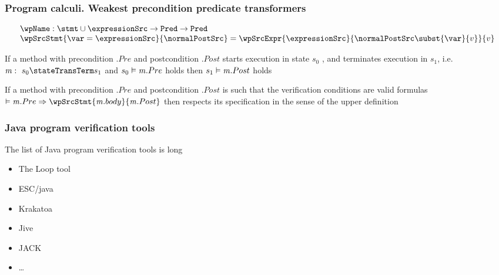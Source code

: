 \documentclass{beamer}
\begin{document}
 \begin{frame}[shrink]\frametitle{Program calculi. Weakest precondition  predicate transformers}
   \begin{definition}

   $$ \begin{array}{l} 
       \wpName : \stmt \cup \expressionSrc \rightarrow \Pred   \rightarrow \Pred   \\
       \wpSrcStmt{ \var = \expressionSrc}{\normalPostSrc } =  \wpSrcExpr{\expressionSrc}{\normalPostSrc \subst{\var}{v} }{v} \\
    \end{array}
$$
      \end{definition} 

  \begin{definition}
     If a method \methodd{} with precondition  \methodd.$Pre$
        and postcondition \methodd.$Post$ starts execution in state $s_0$ , and terminates execution in $s_1$, i.e.  \ $\methodd: \  s_0  \stateTransTerm s_1 $ 
          and $s_0 \vDash \mbox{\rm\textit{m}}.Pre $ holds    
         then $s_1 \vDash \mbox{\rm\textit{m}}.Post$ holds
       \end{definition}

     \begin{theorem}
        If a method \methodd{} with precondition  \methodd.$Pre$
        and postcondition \methodd.$Post$ is such that 
        the verification conditions are valid formulas 
$ \vDash \methodd.Pre \Rightarrow \wpSrcStmt{\methodd.body}{\methodd.Post } $ 
        then \methodd{} respects its specification in the sense of the upper definition
       \end{theorem}    
   
 \end{frame}


\begin{frame}\frametitle{Java program verification tools}

The list of Java program verification tools is long 
\begin{itemize}
   \item  The Loop tool
     \item ESC/java
       \item Krakatoa
	 \item Jive
	     \item JACK 
	       \item \ldots
\end{itemize}
\end{frame}
\end{document}
